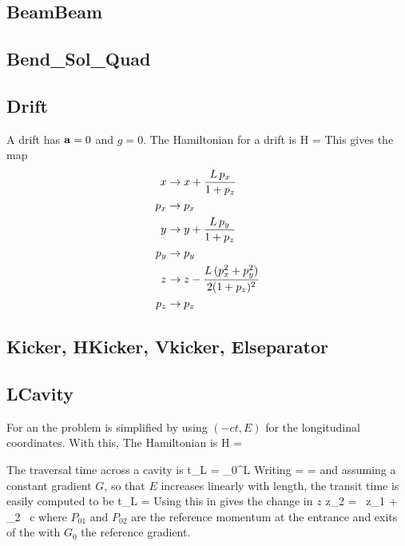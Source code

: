 \documentclass{book}
\begin{document}
\subsection{BeamBeam}


\subsection{Bend\_Sol\_Quad}

\subsection{Drift}

A drift has ${\bf a} = 0$ and $g = 0$. The Hamiltonian for a drift is
\Begineq
  H =  
\Endeq
This gives the map
\begin{align}
  x   &\rightarrow x + \frac{L \, p_x}{1 + p_z} \nonumber \\
  p_x &\rightarrow p_x  \nonumber \\
  y   &\rightarrow y + \frac{L \, p_y}{1 + p_z} \nonumber \\
  p_y &\rightarrow p_y  \\
  z   &\rightarrow z - \frac{L \, (p_x^2 + p_y^2)}{2 (1 + p_z)^2} \nonumber \\
  p_z &\rightarrow p_z \nonumber
\end{align}

\subsection{Kicker, HKicker, Vkicker, Elseparator}


\subsection{LCavity}

For an  the problem is simplified by using $(-ct, E)$ for
the longitudinal coordinates. With this, The Hamiltonian is
\Begineq
  H = 
\Endeq

The traversal time across a cavity is
\Begineq
  t_L = \int_0^L 
\Endeq
Writing
\Begineq
   =  = 
\Endeq
and assuming a constant gradient $G$, so that $E$ increases linearly
with length, the transit time is easily computed to be
\Begineq
  t_L = 
\Endeq
Using this in  gives the change in $z$
\Begineq
  z_2 =  \, z_1 + 
  \beta_2 \, c 
\Endeq
where $P_{01}$ and $P_{02}$ are the reference momentum at the entrance
and exits of the  with $G_0$ the reference gradient. 
\end{document}
